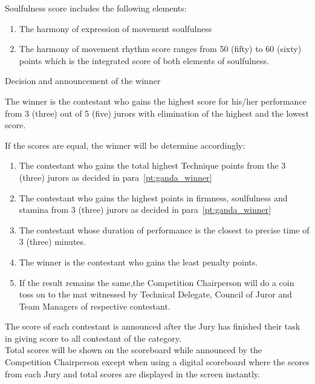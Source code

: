 \begin{legal}
\begin{legal}
\begin{legal}
        \item Soulfulness score includes the following elements:
            \begin{enumerate}[label=\alph*.]
            \item The harmony of expression of movement soulfulness
            \item The harmony of movement rhythm score ranges from 50 (fifty) to 60 (sixty)
                  points which is the integrated score of both elements of soulfulness. 
            \end{enumerate}
        \end{legal}
    \end{legal}

\item Decision and announcement of the winner
    \begin{legal}
    \item\label{pt:ganda_winner} The winner is the contestant who gains the highest score for his/her performance from 3 (three) out of 5 (five) jurors with elimination of the highest and the lowest score.
    \item If the scores are equal, the winner will be determine accordingly:
            \begin{enumerate}[label=\alph*.]
            \item The contestant who gains the total highest Technique points from the 3 (three) jurors as decided in para~\ref{pt:ganda_winner}
            \item The contestant who gains the highest points in firmness, soulfulness and stamina from 3 (three) jurors as decided in para~\ref{pt:ganda_winner}
            \item  The contestant whose duration of performance is the closest to precise time of 3 (three) minutes.
            \item  The winner is the contestant who gains the least penalty points.
            \item If the result remains the same,the Competition Chairperson will do a coin toss on to the mat 
            witnessed by Technical Delegate, Council of Juror and Team Managers of respective contestant. 
            \end{enumerate}
    \item The score of each contestant is announced after the Jury has finished their task in giving score to all contestant of the category.\\

    Total scores will be shown on the scoreboard while announced by the Competition Chairperson except when using a digital scoreboard where the scores from each Jury and total scores are displayed in the screen instantly.

    \end{legal}

\end{legal}
